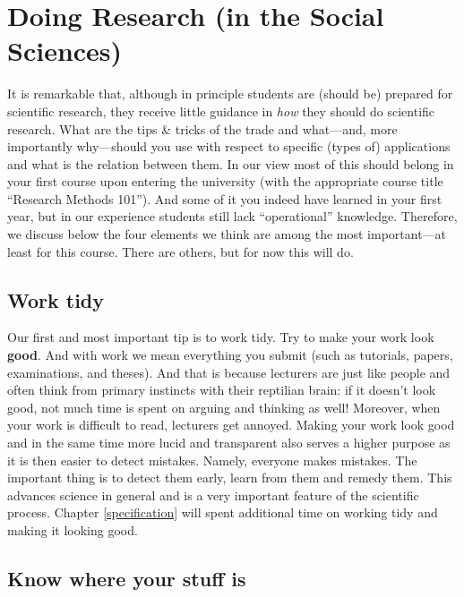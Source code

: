 \documentclass[
]{book}
\begin{document}
\hypertarget{doing-research-in-the-social-sciences}{%
\section{Doing Research (in the Social Sciences)}\label{doing-research-in-the-social-sciences}}

It is remarkable that, although in principle students are (should be) prepared for scientific research, they receive little guidance in \emph{how} they should do scientific research. What are the tips \& tricks of the trade and what---and, more importantly why---should you use with respect to specific (types of) applications and what is the relation between them. In our view most of this should belong in your first course upon entering the university (with the appropriate course title ``Research Methods 101''). And some of it you indeed have learned in your first year, but in our experience students still lack ``operational'' knowledge. Therefore, we discuss below the four elements we think are among the most important---at least for this course. There are others, but for now this will do.

\hypertarget{work-tidy}{%
\subsection{Work tidy}\label{work-tidy}}

Our first and most important tip is to work tidy. Try to make your work look \textbf{good}. And with work we mean everything you submit (such as tutorials, papers, examinations, and theses). And that is because lecturers are just like people and often think from primary instincts with their reptilian brain: if it doesn't look good, not much time is spent on arguing and thinking as well! Moreover, when your work is difficult to read, lecturers get annoyed. Making your work look good and in the same time more lucid and transparent also serves a higher purpose as it is then easier to detect mistakes. Namely, everyone makes mistakes. The important thing is to detect them early, learn from them and remedy them. This advances science in general and is a very important feature of the scientific process. Chapter \ref{specification} will spent additional time on working tidy and making it looking good.

\hypertarget{know-where-your-stuff-is}{%
\subsection{Know where your stuff is}\label{know-where-your-stuff-is}}
\end{document}
